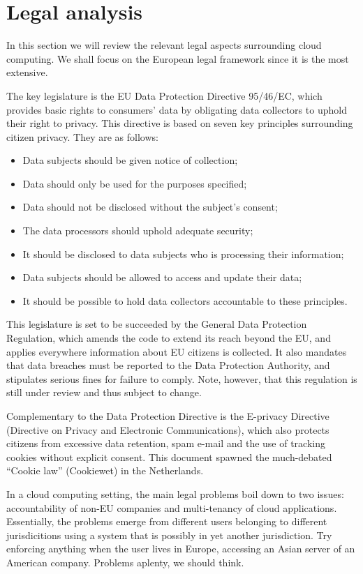\documentclass[11pt]{article}
\begin{document}
\section{Legal analysis}
\label{sec:legal_analysis}

In this section we will review the relevant legal aspects surrounding cloud computing. We shall focus on the European legal framework since it is the most extensive.

The key legislature is the EU Data Protection Directive 95/46/EC, which provides basic rights to consumers' data by obligating data collectors to uphold their right to privacy. \cite{directive199595}
This directive is based on seven key principles surrounding citizen privacy.
They are as follows:
\begin{itemize}
\item Data subjects should be given notice of collection;
\item Data should only be used for the purposes specified;
\item Data should not be disclosed without the subject's consent;
\item The data processors should uphold adequate security;
\item It should be disclosed to data subjects who is processing their information;
\item Data subjects should be allowed to access and update their data;
\item It should be possible to hold data collectors accountable to these principles.
\end{itemize}

This legislature is set to be succeeded by the General Data Protection Regulation, which amends the code to extend its reach beyond the EU, and applies everywhere information about EU citizens is collected.
It also mandates that data breaches must be reported to the Data Protection Authority, and stipulates serious fines for failure to comply.
Note, however, that this regulation is still under review and thus subject to change.

Complementary to the Data Protection Directive is the E-privacy Directive (Directive on Privacy and Electronic Communications), which also protects citizens from excessive data retention, spam e-mail and the use of tracking cookies without explicit consent.
This document spawned the much-debated ``Cookie law'' (Cookiewet) in the Netherlands.

In a cloud computing setting, the main legal problems boil down to two issues: accountability of non-EU companies and multi-tenancy of cloud applications. Essentially, the problems emerge from different users belonging to different jurisdicitions using a system that is possibly in yet another jurisdiction. Try enforcing anything when the user lives in Europe, accessing an Asian server of an American company. Problems aplenty, we should think.
\end{document}
